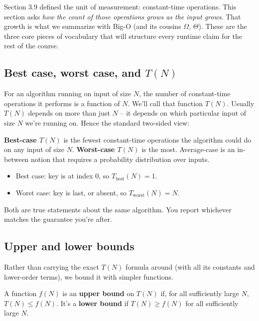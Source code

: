 \documentclass[11pt]{article}
\begin{document}
Section 3.9 defined the unit of measurement: constant-time operations.
This section asks \emph{how the count of those operations grows as
the input grows}. That growth is what we summarize with Big-O (and
its cousins $\Omega$, $\Theta$). These are the three core pieces of
vocabulary that will structure every runtime claim for the rest of
the course.

\subsection{Best case, worst case, and $T(N)$}

For an algorithm running on input of size $N$, the number of
constant-time operations it performs is a function of $N$. We'll
call that function $T(N)$. Usually $T(N)$ depends on more than just
$N$ -- it depends on which particular input of size $N$ we're running
on. Hence the standard two-sided view:

\begin{defnbox}
\textbf{Best-case $T(N)$} is the fewest constant-time operations the
algorithm could do on any input of size $N$. \textbf{Worst-case
$T(N)$} is the most. Average-case is an in-between notion that
requires a probability distribution over inputs.
\end{defnbox}

\begin{examplebox}
\begin{itemize}[leftmargin=*]
  \item Best case: key is at index 0, so $T_{\text{best}}(N) = 1$.
  \item Worst case: key is last, or absent, so $T_{\text{worst}}(N) = N$.
\end{itemize}
Both are true statements about the same algorithm. You report
whichever matches the guarantee you're after.
\end{examplebox}

\subsection{Upper and lower bounds}

Rather than carrying the exact $T(N)$ formula around (with all its
constants and lower-order terms), we bound it with simpler functions.

\begin{defnbox}
A function $f(N)$ is an \textbf{upper bound} on $T(N)$ if, for all
sufficiently large $N$, $T(N) \le f(N)$. It's a \textbf{lower bound}
if $T(N) \ge f(N)$ for all sufficiently large $N$.
\end{defnbox}
\end{document}
